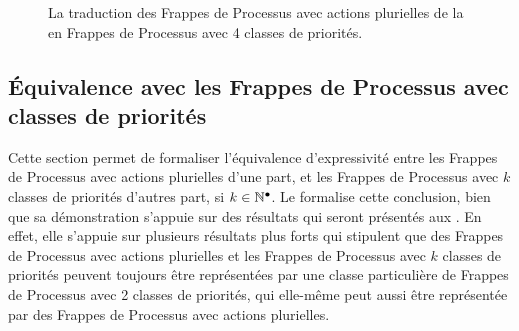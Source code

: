 \begin{example}
  \begin{figure}[ht]
  \begin{center}
  \caption{%
    La traduction des Frappes de Processus avec actions plurielles
    de la  en Frappes de Processus avec 4 classes de priorités.
  }
  \end{center}
  \end{figure}
\end{example}



\subsection{Équivalence avec les Frappes de Processus avec classes de priorités}

Cette section permet de formaliser l'équivalence d'expressivité entre les Frappes de Processus
avec actions plurielles d'une part, et les Frappes de Processus avec $k$ classes de priorités
d'autres part, si $k \in \mathbb{N}^\bullet$.
Le  formalise cette conclusion,
bien que sa démonstration s'appuie sur des résultats qui seront
présentés aux  \storef.
En effet, elle s'appuie sur plusieurs résultats plus forts qui stipulent que des
Frappes de Processus avec actions plurielles
et les Frappes de Processus avec $k$ classes de priorités
peuvent toujours être représentées
par une classe particulière de Frappes de Processus avec 2 classes de priorités,
qui elle-même peut aussi être représentée par des
Frappes de Processus avec actions plurielles.

